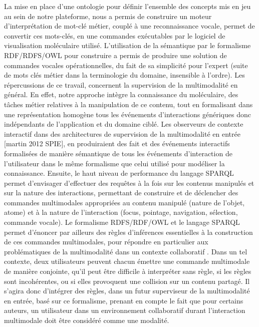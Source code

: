 La mise en place d'une ontologie pour définir l'ensemble des concepts mis en jeu au sein de notre plateforme, nous a permis de construire un moteur d'interprétation de mot-clé métier, couplé à une reconnaissance vocale, permet de convertir ces mots-clés, en une commandes exécutables par le logiciel de visualisation moléculaire utilisé. L'utilisation de la sémantique par le formalisme RDF/RDFS/OWL pour construire a permis de produire une solution de commandes vocales opérationnelles, du fait de sa simplicité pour l'expert (suite de mots clés métier dans la terminologie du domaine, insensible à l'ordre). Les répercussions de ce travail, concernent la supervision de la multimodalité en général. En effet, notre approche intègre la connaissance du moléculaire, des tâches métier relatives à la manipulation de ce contenu, tout en formalisant dans une représentation homogène tous les événements d'interactions génériques donc indépendants de l'application et du domaine ciblé. Les observeurs de contexte interactif dans des architectures de supervision de la multimodalité en entrée [martin 2012 SPIE], en produiraient des fait et des événements interactifs formalisées de manière sémantique de tous les événements d'interaction de l'utilisateur dans le même formalisme que celui utilisé pour modéliser la connaissance. Ensuite, le haut niveau de performance du langage SPARQL permet d'envisager d'effectuer des requêtes à la fois sur les contenus manipulés et sur la nature des interactions, permettant de construire et de déclencher des commandes multimodales appropriées au contenu manipulé (nature de l'objet, atome) et à la nature de l'interaction (focus, pointage, navigation, sélection, commande vocale). Le formalisme RDFS/RDF/OWL et le langage SPARQL permet d'énoncer par ailleurs des règles d'inférences essentielles à la construction de ces commandes multimodales, pour répondre en particulier aux problématiques de la multimodalité dans un contexte collaboratif \cite{martin2014hardware}. 
Dans un tel contexte, deux utilisateurs peuvent chacun émettre une commande multimodale de manière conjointe, qu'il peut être difficile à interpréter sans règle, si les règles sont incohérentes, ou si elles provoquent une collision sur un contenu partagé. Il s'agira donc d'intégrer des règles, dans un futur superviseur de la multimodalité en entrée, basé sur ce formalisme, prenant en compte le fait que pour certains auteurs, un utilisateur dans un environnement collaboratif durant l'interaction multimodale doit être considéré comme une modalité.


